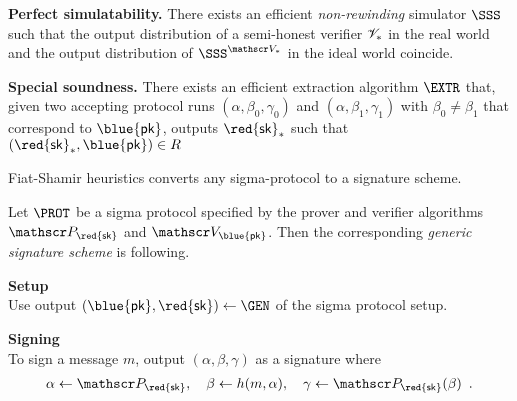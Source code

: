 \documentclass[landscape,footrule]{foils}
\renewcommand{\SK}{{\red{\mathsf{sk}}}}
\renewcommand{\PK}{{\blue{\mathsf{pk}}}}
\begin{document}

\Bigskip

\begin{triangles}
\item \textbf{Perfect simulatability.} There exists an efficient
  \emph{non-rewinding} simulator $\SSS$ such that the output
  distribution of a semi-honest verifier $\mathscr{V}_*$ in the real
  world and the output distribution of $\SSS^{\VERIFIER_*}$ in the
  ideal world coincide.
\item \textbf{Special soundness.} There exists an efficient extraction
  algorithm $\EXTR$ that, given two accepting protocol runs
  $(\alpha,\beta_0,\gamma_0)$ and $(\alpha,\beta_1,\gamma_1)$ with
  $\beta_0\neq \beta_1$ that correspond to $\PK$, outputs $\SK_*$ such
  that $(\SK_*,\PK)\in R$

\end{triangles}



Fiat-Shamir heuristics converts any sigma-protocol to a signature scheme.



\enlargethispage{1cm}

Let $\PROT$ be a sigma protocol specified by the prover and verifier
algorithms $\PROVER_\SK$ and $\VERIFIER_\PK$. Then the corresponding
\emph{generic signature scheme} is following.

\textbf{Setup}\vspace*{1ex}\\
\hspace*{1.5em} Use output $(\PK,\SK)\gets\GEN$ of the sigma protocol setup.

\textbf{Signing}\vspace*{1ex}\\
\hspace*{1.5em} To sign a message $m$, output $(\alpha,\beta,\gamma)$
as a signature where
\begin{align*}
  \alpha\gets \PROVER_\SK,\quad \beta\gets h(m,\alpha),\quad
  \gamma\gets\PROVER_\SK(\beta)\enspace.
\end{align*}\ \vspace*{-8ex}\\
 
\end{document}
